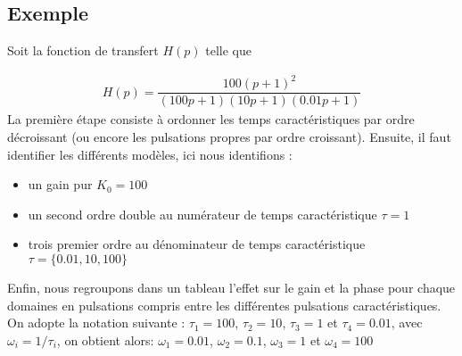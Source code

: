 \subsection*{Exemple}

Soit la fonction de transfert $H(p)$ telle que 

\begin{align}
    H(p) = \dfrac{100(p+1)^2}{(100p+1)(10p+1)(0.01p+1)}\label{eq-ft_qq}
\end{align}
La première étape consiste à ordonner les temps caractéristiques par ordre décroissant 
(ou encore les pulsations propres par ordre croissant). Ensuite, il faut identifier 
les différents modèles, ici nous identifions :
\begin{itemize}
    \item un gain pur $K_0=100$
    \item un second ordre double au numérateur de temps caractéristique $\tau=1$
    \item trois premier ordre au dénominateur de temps caractéristique $\tau=\{0.01,10,100\}$
\end{itemize}

Enfin, nous regroupons dans un tableau l'effet 
sur le gain et la phase pour chaque domaines en pulsations compris entre les 
différentes pulsations caractéristiques.
On adopte la notation suivante : $\tau_1=100$, $\tau_2=10$, $\tau_3=1$ et $\tau_4=0.01$, avec $\omega_i=1/\tau_i$, 
on obtient alors:
$\omega_1=0.01$, $\omega_2=0.1$, $\omega_3=1$ et $\omega_4=100$

\begin{table}[!h]
\end{table}


